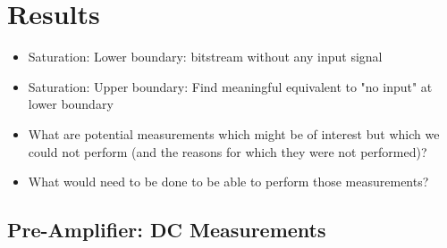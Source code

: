 \chapter{Results}
\label{chap:results}


\begin{itemize}\tightlist
    \item
        Saturation: Lower boundary: bitstream without any input signal
    \item
        Saturation: Upper boundary: Find meaningful equivalent to "no input" at lower boundary
    \item
        What are potential  measurements which might be of  interest but which
        we  could  not perform  (and  the  reasons  for  which they  were  not
        performed)?
    \item
        What would need to be done to be able to perform those measurements?
\end{itemize}

%

\section{Pre-Amplifier: DC Measurements}
\label{sec:preAmpDC}


